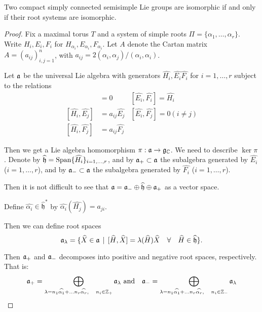 \documentclass[11pt, english]{article}
\begin{document}
\begin{thm}
 Two compact simply connected semisimple Lie groups are isomorphic if and only if their root systems are isomorphic.
\end{thm}
\begin{proof}
Fix a maximal torus $T$ and a system of simple roots $\Pi = \{ \alpha_1, \ldots, \alpha_r \}$. Write $H_i, E_i,F_i$ for $H_{\alpha_i}, E_{\alpha_i}, F_{\alpha_i}$. Let $A$ denote the Cartan matrix $A = (a_{ij})_{i,j=1}^n$, with $a_{ij}=2(\alpha_i,\alpha_j)/(\alpha_i,\alpha_i)$. 

Let $\mathfrak{a}$ be the universal Lie algebra with generators $\widehat{H_i}, \widehat {E_i} \widehat{F_i}$ for $i=1,\ldots,r$ subject to the relations 
\begin{align*}
  [\widehat{H_i}, \widehat{H_i}] &= 0 & [\widehat{E_i},\widehat{F_i}]=\widehat{H_i} \\
[\widehat{H_i}, \widehat{E_j}] &= a_{ij}\widehat{E_j} & [\widehat{E_i}, \widehat{F_j}]=0 (i \neq j) \\
[\widehat{H_i}, \widehat{F_j}] &= a_{ij} \widehat{F_j} 
\end{align*}

Then we get a Lie algebra homomorphism $\pi:\mathfrak{a} \to \mathfrak g_{\mathbb{C}}$. We need to describe $\ker \pi$. Denote by $\widehat{\mathfrak h}  = \operatorname{Span} \{ \widehat{H_i} \}_{i=1,\ldots,r}$, and by $\mathfrak{a}_+ \subset \mathfrak{a}$ the subalgebra generated by $\widehat{E_i}$ ($i=1,\ldots,r$), and by $\mathfrak{a}_- \subset \mathfrak{a}$ the subalgebra generated by $\widehat{F_i}$ ($i=1,\ldots,r$).

Then it is not difficult to see that $\mathfrak{a} = \mathfrak{a}_- \oplus \widehat{\mathfrak h} \oplus \mathfrak{a}_+$ as a vector space.

Define $\widehat{\alpha_i} \in \widehat{\mathfrak h}^\ast$ by $\widehat{\alpha_i}(\widehat{H_j}) = a_{ji}$. 

Then we can define root spaces 
$$
\mathfrak{a}_\lambda = \{ \widehat X \in \mathfrak{a} \, \mid \, [\widehat H, \widehat X] = \lambda(\widehat H) \widehat X \quad \forall \quad \widehat H \in \widehat{\mathfrak h} \}.
$$

Then $\mathfrak{a}_+$ and $\mathfrak{a}_-$ decomposes into positive and negative root spaces, respectively. That is:
\begin{align*}
 \mathfrak{a}_+ = \bigoplus_{\lambda= n_1 \widehat{\alpha_1} + \ldots n_r \widehat{\alpha_r}, \quad n_i \in \mathbb{Z}_+} \mathfrak{a}_\lambda &\text{ and} &  \mathfrak{a}_- = \bigoplus_{\lambda= n_1 \widehat{\alpha_1} + \ldots n_r \widehat{\alpha_r}, \quad n_i \in \mathbb{Z}_-} \mathfrak{a}_\lambda
\end{align*}


\end{proof}
\end{document}
